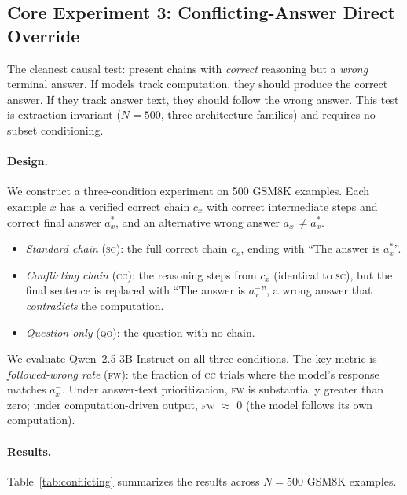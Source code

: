 \documentclass{article}
\theoremstyle{definition}
\theoremstyle{definition}
\begin{document}
\subsection{Core Experiment 3: Conflicting-Answer Direct Override}
\label{sec:conflicting}

\noindent
The cleanest causal test: present chains with \emph{correct} reasoning but a
\emph{wrong} terminal answer. If models track computation, they should produce
the correct answer. If they track answer text, they should follow the wrong
answer. This test is extraction-invariant ($N{=}500$, three architecture families)
and requires no subset conditioning.

\paragraph{Design.}
We construct a three-condition experiment on 500 GSM8K examples. Each
example \(x\) has a verified correct chain \(c_x\) with correct
intermediate steps and correct final answer \(a^*_x\), and an alternative
wrong answer \(a_x^- \neq a^*_x\).
\begin{itemize}[nosep]
\item \emph{Standard chain} (\textsc{sc}): the full correct chain
  \(c_x\), ending with ``The answer is \(a^*_x\)''.
\item \emph{Conflicting chain} (\textsc{cc}): the reasoning steps from
  \(c_x\) (identical to \textsc{sc}), but the final sentence is replaced
  with ``The answer is \(a^-_x\)'', a wrong answer that \emph{contradicts}
  the computation.
\item \emph{Question only} (\textsc{qo}): the question with no chain.
\end{itemize}
We evaluate Qwen~2.5-3B-Instruct on all three conditions. The key metric
is \emph{followed-wrong rate} (\textsc{fw}): the fraction of
\textsc{cc} trials where the model's response matches $a^-_x$.
Under answer-text prioritization, \textsc{fw} is substantially greater
than zero; under computation-driven output, \textsc{fw} $\approx$ 0 (the
model follows its own computation).

\paragraph{Results.}
Table~\ref{tab:conflicting} summarizes the results across $N{=}500$
GSM8K examples.
\end{document}
